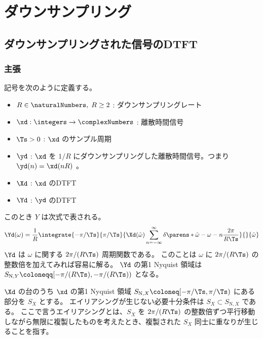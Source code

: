 \chapter{ダウンサンプリング}
    \section{ダウンサンプリングされた信号のDTFT}
        \subsection{主張}
            記号を次のように定義する。
            \begin{itemize}
                \item $R\in\naturalNumbers,\;R\geq 2$ : ダウンサンプリングレート
                \item $\xd:\integers\to\complexNumbers$ : 離散時間信号
                \item $\Ts>0$ : $\xd$ のサンプル周期
                \item $\yd$ : $\xd$ を $1/R$ にダウンサンプリングした離散時間信号。つまり $\yd(n) = \xd(nR)$ 。
                \item $\Xd$ : $\xd$ のDTFT
                \item $\Yd$ : $\yd$ のDTFT
            \end{itemize}
            このとき $Y$ は次式で表される。
            \[ \Yd(\omega) = \frac{1}{R}\integrate{-\pi/\Ts}{\pi/\Ts}{\Xd(\tilde{\omega})\sum_{n=-\infty}^\infty\delta\parens*{\tilde{\omega}-\omega-n\frac{2\pi}{R\Ts}}}{}{\tilde{\omega}} \]
            $\Yd$ は $\omega$ に関する $2\pi/(R\Ts)$ 周期関数である。
            このことは $\omega$ に $2\pi/(R\Ts)$ の整数倍を加えてみれば容易に解る。
            $\Yd$ の第1 Nyquist 領域は $S_{\text{N},Y} \coloneqq [-\pi/(R\Ts),-\pi/(R\Ts))$ となる。
            \par
            $\Xd$ の台のうち $\xd$ の第1 Nyquist 領域 $S_{\text{N},X} \coloneq [-\pi/\Ts, \pi/\Ts)$ にある部分を $S_X$ とする。
            エイリアシングが生じない必要十分条件は $S_X\subset S_{\text{N},X}$ である。
            ここで言うエイリアシングとは、$S_X$ を $2\pi/(R\Ts)$ の整数倍ずつ平行移動しながら無限に複製したものを考えたとき、複製された $S_X$ 同士に重なりが生じることを指す。
